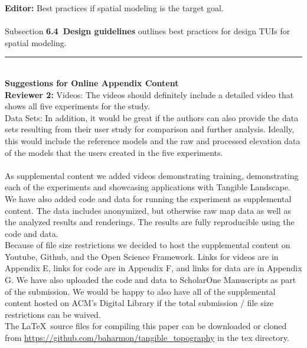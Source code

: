 \documentclass[prodmode,acmtochi]{acmsmall} %
\newcommand{\doublerule}[1][.4pt]{%
  \noindent
  \makebox[0pt][l]{\rule[.7ex]{\linewidth}{#1}}%
  \rule[.3ex]{\linewidth}{#1}}
\begin{document}
\textbf{Editor:} Best practices if spatial modeling is the target goal.\\

\hrulefill \\

Subsection \textbf{6.4~Design guidelines} outlines best practices
for design TUIs for spatial modeling. \\

\doublerule \\

\textbf{Suggestions for Online Appendix Content} \\

\textbf{Reviewer 2:} 
Videos: 
The videos should definitely include a detailed video that shows all five experiments for the study.\\

Data Sets:
In addition, it would be great if the authors can also provide the data sets resulting from their user study for comparison and further analysis. Ideally, this would include the reference models and the raw and processed elevation data of the models that the users created in the five experiments.\\

\hrulefill \\

As supplemental content
we added videos demonstrating training, 
demonstrating each of the experiments 
and showcasing applications with Tangible Landscape. 
We have also added code and data for running the experiment
as supplemental content. The data includes anonymized, 
but otherwise raw map data as well as the analyzed results
and renderings.
The results are fully reproducible using the code and data.\\

Because of file size restrictions we decided to host the
supplemental content on Youtube, Github, and 
the Open Science Framework. 
Links for videos are in Appendix E, 
links for code are in Appendix F,
and links for data are in Appendix G. 
We have also uploaded the code and data 
to ScholarOne Manuscripts as part of the submission.
We would be happy to also have all of the supplemental content
hosted on ACM's Digital Library if the total submission / file size restrictions 
can be waived.\\

The \LaTeX~source files for compiling this paper 
can be downloaded or cloned from 
\url{https://github.com/baharmon/tangible_topography}
in the tex directory.



\end{document}
